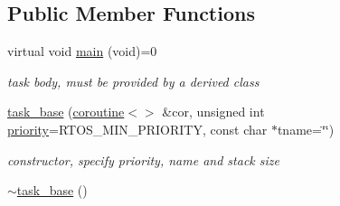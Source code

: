 \subsection*{Public Member Functions}
\begin{DoxyCompactItemize}
\item 
virtual void \hyperlink{classrtos_1_1task__base_a35016dfecdd20ce4786ef7a16154976a}{main} (void)=0
\begin{DoxyCompactList}\small\item\em task body, must be provided by a derived class \end{DoxyCompactList}\item 
\hyperlink{classrtos_1_1task__base_aa7a9351a480725a93f1c2f99451e28e2}{task\+\_\+base} (\hyperlink{classcoroutine}{coroutine}$<$$>$ \&cor, unsigned int \hyperlink{classrtos_1_1task__base_aca1f728cef4c3e70e1ce08b6e313b586}{priority}=R\+T\+O\+S\+\_\+\+M\+I\+N\+\_\+\+P\+R\+I\+O\+R\+I\+TY, const char $\ast$tname=\char`\"{}\char`\"{})
\begin{DoxyCompactList}\small\item\em constructor, specify priority, name and stack size \end{DoxyCompactList}\item 
\hyperlink{classrtos_1_1task__base_a8df882df03cd39af4f21609ba1e002e4}{$\sim$task\+\_\+base} ()\hypertarget{classrtos_1_1task__base_a8df882df03cd39af4f21609ba1e002e4}{}\label{classrtos_1_1task__base_a8df882df03cd39af4f21609ba1e002e4}


\end{DoxyCompactItemize}

